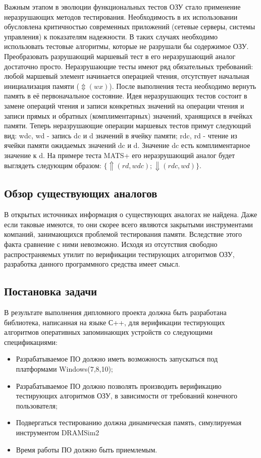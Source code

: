 Важным этапом в эволюции функциональных тестов ОЗУ стало применение неразрушающих методов тестирования. Необходимость в их использовании обусловлена критичностью современных приложений (сетевые серверы, системы управления) к показателям надежности\cite{March_Tests_Ivaniuk}. В таких случаях необходимо использовать тестовые алгоритмы, которые не разрушали бы содержимое ОЗУ. Преобразовать разрушающий маршевый тест в его неразрушающий аналог достаточно просто. Неразрушающие тесты имеют ряд обязательных требований: любой маршевый элемент начинается операцией чтения, отсутствует начальная инициализация памяти ($\Updownarrow (wx)$). После выполнения теста необходимо вернуть память в её первоначальное состояние. Идея неразрушающих тестов состоит в замене операций чтения и записи конкретных значений на операции чтения и записи прямых и обратных (комплиментарных) значений, хранящихся в ячейках памяти. 
Теперь неразрушающие операции маршевых тестов примут следующий вид: wdc, wd - запись dc и d значений в ячейку памяти; rdc, rd - чтение из ячейки памяти ожидаемых значений dc и d. Значение dc есть комплиментарное значение к d. На примере теста MATS+ его неразрушающий аналог будет выглядеть следующим образом: $\{\Uparrow (rd,wdc); \Downarrow (rdc,wd)\}$.

\subsection{Обзор существующих аналогов}
\label{sub:domain:analogue}
В открытых источниках информация о существующих аналогах не найдена. Даже если таковые имеются, то они скорее всего являются закрытыми инструментами компаний, занимающихся проблемой тестирования памяти. Вследствие этого факта сравнение с ними невозможно. Исходя из отсутствия свободно распространяемых утилит по верификации тестирующих алгоритмов ОЗУ, разработка данного программного средства имеет смысл.

\subsection{Постановка задачи}
\label{sub:domain:task}
В результате выполнения дипломного проекта должна быть разработана библиотека, написанная на языке С++, для верификации тестирующих алгоритмов оперативных запоминающих устройств со следующими спецификациями:
\begin{itemize}
  \item Разрабатываемое ПО должно иметь возможность запускаться под платформами Windows(7,8,10);
  \item Разрабатываемое ПО должно позволять производить верификацию тестирующих алгоритмов ОЗУ, в зависимости от требований
конечного пользователя;
  \item Подвергаться тестированию должна динамическая память, симулируемая инструментом DRAMSim2
  \item Время работы ПО должно быть приемлемым.
\end{itemize}




